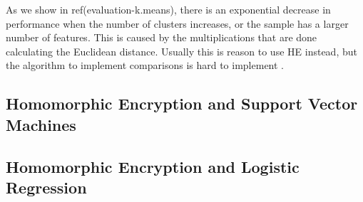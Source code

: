 As we show in ref(evaluation-k.means), there is an exponential decrease in performance when the number of clusters increases, or the sample has a larger number of features. This is caused by the multiplications that are done calculating the Euclidean distance. Usually this is reason to use \ac{HE} instead, but the algorithm to implement comparisons is hard to implement \cite{blake2004strong}.




\subsection{Homomorphic Encryption and Support Vector Machines}
\label{ssec:GCandk-M}
\subsection{Homomorphic Encryption and Logistic Regression}
\label{ssec:GCandk-M}
